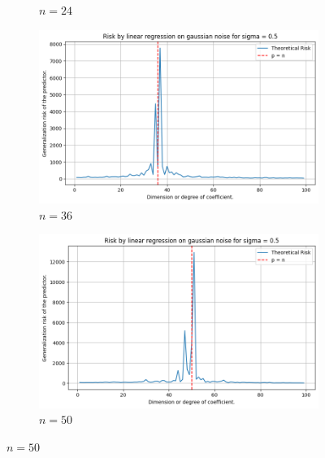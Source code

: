 \documentclass{article}
\begin{document}
\begin{figure}[htb]
\begin{subfigure}[b]{\imgwidth}
    \caption{$n=24$}\label{fig:1b2}
  \end{subfigure}%
  \hfill
  \begin{subfigure}[b]{\imgwidth}
    \includegraphics[width=\linewidth]{img/descent_devel3.png}
    \caption{$n=36$}\label{fig:1c2}
  \end{subfigure}%
  \hfill
  \begin{subfigure}[b]{\imgwidth}
    \includegraphics[width=\linewidth]{img/descent_devel4.png}
    \caption{$n=50$}\label{fig:1d2}
  \end{subfigure}

  \medskip


\end{figure}
\end{document}
